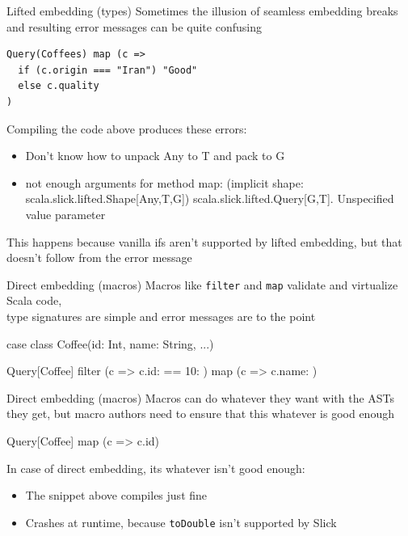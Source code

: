 \documentclass{beamer}
\begin{document}
\begin{frame}[fragile]{Lifted embedding (types)}
  Sometimes the illusion of seamless embedding breaks and
  resulting error messages can be quite confusing

  \vspace{1em}
  \begin{verbatim}
Query(Coffees) map (c =>
  if (c.origin === "Iran") "Good"
  else c.quality
)\end{verbatim}

  \vspace{1em}
  Compiling the code above produces these errors:
  \begin{itemize}
  \item Don’t know how to unpack Any to T and pack to G
  \item not enough arguments for method map: (implicit shape: scala.slick.lifted.Shape[Any,T,G])
  scala.slick.lifted.Query[G,T]. Unspecified value parameter
  \end{itemize}

  \vspace{1em}
  This happens because vanilla ifs aren't supported by lifted embedding,
  but that doesn't follow from the error message
\end{frame}

\begin{frame}[fragile]{Direct embedding (macros)}
  Macros like \texttt{filter} and \texttt{map} validate and virtualize Scala code,\\
  type signatures are simple and error messages are to the point

  \vspace{1em}
  \begin{semiverbatim}
case class Coffee(id: Int, name: String, ...)

Query[Coffee] filter
  (c => c.id: \text{\color{blue}{Int}} == 10: \text{\color{blue}{Int}}) map
  (c => c.name: \text{\color{blue}{String}})
  \end{semiverbatim}
\end{frame}

\begin{frame}[fragile]{Direct embedding (macros)}
  Macros can do whatever they want with the ASTs they get,
  but macro authors need to ensure that this whatever is good enough

  \vspace{1em}
  \begin{semiverbatim}
Query[Coffee] map
  (c => c.id\text{\color{blue}{.toDouble}})\end{semiverbatim}

  \vspace{1em}
  In case of direct embedding, its whatever isn't good enough:
  \begin{itemize}
  \item The snippet above compiles just fine
  \item Crashes at runtime, because \texttt{toDouble} isn't supported by Slick
  \end{itemize}
\end{frame}
\end{document}
